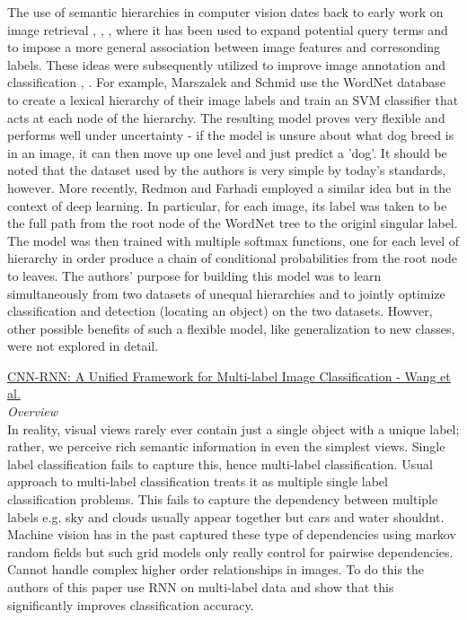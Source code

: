\documentclass[12pt]{report}
\begin{document}
The use of semantic hierarchies in computer vision dates back to early work on image retrieval \cite{Aslandogan1997}, \cite{Zhao2001}, \cite{Grosky2002} \cite{Barnard2001}, where it has been used to expand potential query terms and to impose a more general association between image features and corresonding labels. These ideas were subsequently utilized to improve image annotation and classification \cite{Srikanth2005}, \cite{Marszaek2007} \cite{Griffin2013}. For example, Marszalek and Schmid \cite{Marszaek2007} use the WordNet database to create a lexical hierarchy of their image labels and train an SVM classifier \cite{Scholkopf2002} that acts at each node of the hierarchy. The resulting model proves very flexible and performs well under uncertainty - if the model is unsure about what dog breed is in an image, it can then move up one level and just predict a 'dog'. It should be noted that the dataset used by the authors is very simple by today's standards, however. More recently, Redmon and Farhadi \cite{Redmon} employed a similar idea but in the context of deep learning. In particular, for each image, its label was taken to be the full path from the root node of the WordNet tree to the originl singular label. The model was then trained with multiple softmax functions, one for each level of hierarchy in order produce a chain of conditional probabilities from the root node to leaves. The authors' purpose for building this model was to learn simultaneously from two datasets of unequal hierarchies and to jointly optimize classification and detection (locating an object) on the two datasets. Howver, other possible benefits of such a flexible model, like generalization to new classes, were not explored in detail.



\underline{CNN-RNN: A Unified Framework for Multi-label Image Classification - Wang et al.} \\
\textit{Overview}\\
In reality, visual views rarely ever contain just a single object with a unique label; rather, we perceive rich semantic information in even the simplest views. Single label classification fails to capture this, hence multi-label classification. Usual approach to multi-label classification treats it as multiple single label classification problems. This fails to capture the dependency between multiple labels e.g. sky and clouds usually appear together but cars and water shouldnt. Machine vision has in the past captured these type of dependencies using markov random fields but such grid models only really control for pairwise dependencies. Cannot handle complex higher order relationships in images. To do this the authors of this paper use RNN on multi-label data and show that this significantly improves classification accuracy. \\
\end{document}
